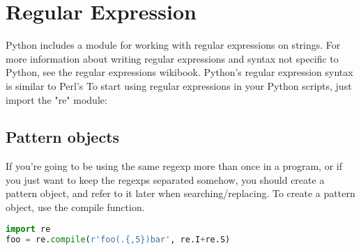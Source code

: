 \section{Regular Expression}
Python includes a module for working with regular expressions on strings. For
more information about writing regular expressions and syntax not specific to
Python, see the regular expressions wikibook. Python's regular expression syntax
is similar to Perl's To start using regular expressions in your Python scripts,
just import the "re" module:

\subsection{Pattern objects}
If you're going to be using the same regexp more than once in a program, or if
you just want to keep the regexps separated somehow, you should create a pattern
object, and refer to it later when searching/replacing.  To create a pattern
object, use the compile function.
\lstset{basicstyle=\scriptsize, numbers=left, captionpos=b, tabsize=4}
\begin{lstlisting}[caption=Pattern objects,language={Python},
xleftmargin=15pt, label=lst:patternobjects]
import re
foo = re.compile(r'foo(.{,5})bar', re.I+re.S)
\end{lstlisting}

